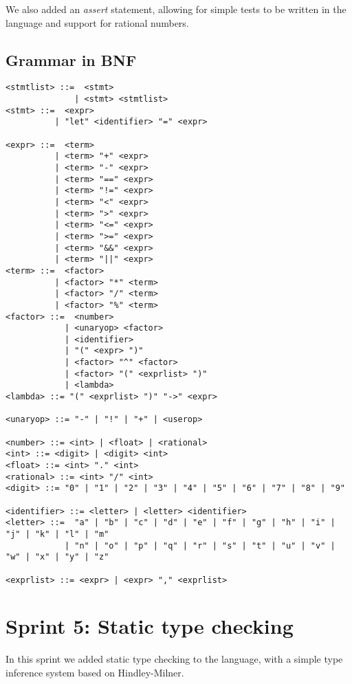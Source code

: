 We also added an \textit{assert} statement, allowing for simple tests to be written in the language and support for 
rational numbers.

\subsection{Grammar in BNF}\label{subsec:grammar-in-bnf4}

\begin{verbatim}
<stmtlist> ::=  <stmt> 
              | <stmt> <stmtlist>
<stmt> ::=  <expr> 
          | "let" <identifier> "=" <expr>

<expr> ::=  <term> 
          | <term> "+" <expr> 
          | <term> "-" <expr>
          | <term> "==" <expr>
          | <term> "!=" <expr>
          | <term> "<" <expr>
          | <term> ">" <expr>
          | <term> "<=" <expr>
          | <term> ">=" <expr>
          | <term> "&&" <expr>
          | <term> "||" <expr>
<term> ::=  <factor> 
          | <factor> "*" <term> 
          | <factor> "/" <term> 
          | <factor> "%" <term> 
<factor> ::=  <number> 
            | <unaryop> <factor>
            | <identifier> 
            | "(" <expr> ")" 
            | <factor> "^" <factor>
            | <factor> "(" <exprlist> ")"
            | <lambda>
<lambda> ::= "(" <exprlist> ")" "->" <expr>

<unaryop> ::= "-" | "!" | "+" | <userop>
            
<number> ::= <int> | <float> | <rational>
<int> ::= <digit> | <digit> <int>
<float> ::= <int> "." <int>
<rational> ::= <int> "/" <int>
<digit> ::= "0" | "1" | "2" | "3" | "4" | "5" | "6" | "7" | "8" | "9"

<identifier> ::= <letter> | <letter> <identifier>
<letter> ::=  "a" | "b" | "c" | "d" | "e" | "f" | "g" | "h" | "i" | "j" | "k" | "l" | "m" 
            | "n" | "o" | "p" | "q" | "r" | "s" | "t" | "u" | "v" | "w" | "x" | "y" | "z"
            
<exprlist> ::= <expr> | <expr> "," <exprlist>

\end{verbatim}

\section{Sprint 5: Static type checking}\label{sec:static-type-checking}

In this sprint we added static type checking to the language, with a simple type inference system based on 
Hindley-Milner.


